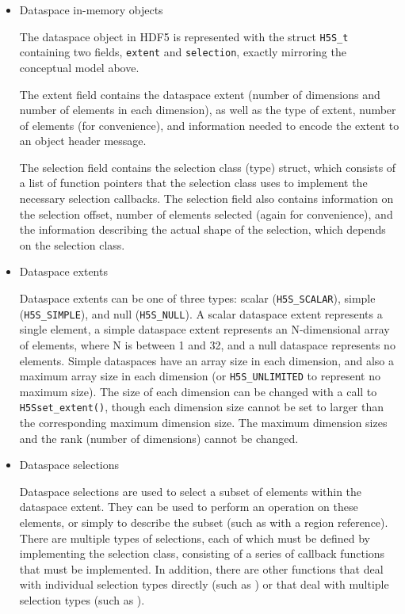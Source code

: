 \begin{itemize}
    \item Dataspace in-memory objects

The dataspace object in HDF5 is represented with the struct \texttt{H5S\_t} containing two fields, \texttt{extent} and \texttt{selection}, exactly mirroring the conceptual model above.

The extent field contains the dataspace extent (number of dimensions and number of elements in each dimension), as well as the type of extent, number of elements (for convenience), and information needed to encode the extent to an object header message.

The selection field contains the selection class (type) struct, which consists of a list of function pointers that the selection class uses to implement the necessary selection callbacks. The selection field also contains information on the selection offset, number of elements selected (again for convenience), and the information describing the actual shape of the selection, which depends on the selection class.

    \item Dataspace extents

Dataspace extents can be one of three types: scalar (\texttt{H5S\_SCALAR}), simple (\texttt{H5S\_SIMPLE}), and null (\texttt{H5S\_NULL}). A scalar dataspace extent represents a single element, a simple dataspace extent represents an N-dimensional array of elements, where N is between 1 and 32, and a null dataspace represents no elements. Simple dataspaces have an array size in each dimension, and also a maximum array size in each dimension (or \texttt{H5S\_UNLIMITED} to represent no maximum size). The size of each dimension can be changed with a call to \texttt{H5Sset\_extent()}, though each dimension size cannot be set to larger than the corresponding maximum dimension size. The maximum dimension sizes and the rank (number of dimensions) cannot be changed.

    \item Dataspace selections

Dataspace selections are used to select a subset of elements within the dataspace extent. They can be used to perform an operation on these elements, or simply to describe the subset (such as with a region reference). There are multiple types of selections, each of which must be defined by implementing the selection class, consisting of a series of callback functions that must be implemented. In addition, there are other functions that deal with individual selection types directly (such as ) or that deal with multiple selection types (such as ).


\end{itemize}
